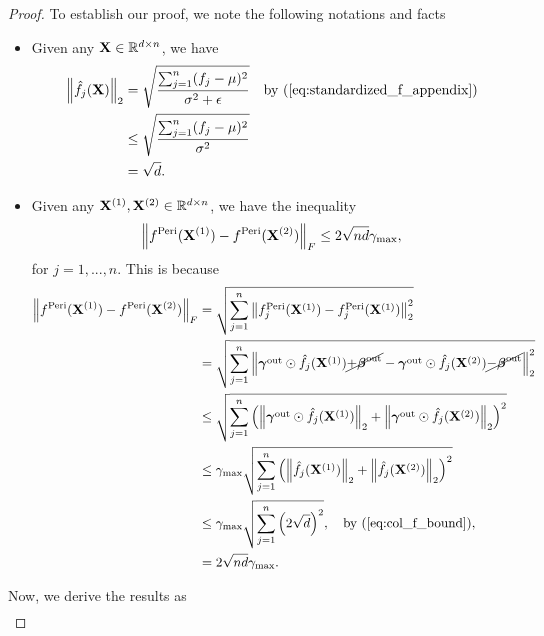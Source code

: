 \documentclass[journal]{IEEEtran}
\newcommand{\bfX}{{\bf X}}
\newcommand{\bfgamma}{{\boldsymbol \gamma}}
\newcommand{\bfbeta}{{\boldsymbol \beta}}
\theoremstyle{plain}
\theoremstyle{definition}
\theoremstyle{remark}
\begin{document}
\begin{proof}
    To establish our proof, we note the following notations and facts
    \begin{itemize}
\item Given any $\bfX \in \mathbb{R}^{d \times n}$, we have
\begin{align}
    \left\| \hat{f}_j(\bfX) \right\|_2 &=  \sqrt{\frac{\sum_{j=1}^n (f_j-\mu)^2}{\sigma^2 + \epsilon}} \quad \text{by (\ref{eq:standardized_f_appendix})} \nonumber \\
    &\leq \sqrt{\frac{\sum_{j=1}^n (f_j-\mu)^2}{\sigma^2 }} \nonumber \\
    &= \sqrt{d} \label{eq:col_f_bound}.
\end{align}
\item Given any $\bfX^{(1)}, \bfX^{(2)} \in \mathbb{R}^{d \times n}$, we have the inequality
        \begin{equation}\label{eq:diff_term_bound}
            \left\|  f^{\rm Peri}(\bfX^{(1)}) - f^{\rm Peri}(\bfX^{(2)}) \right\|_F \leq 2 \sqrt{nd} \gamma_{\rm max},
        \end{equation}
        for $j=1,...,n$. This is because
        \begin{align*}
            \left\|  f^{\rm Peri}(\bfX^{(1)}) - f^{\rm Peri}(\bfX^{(2)}) \right\|_F &= \sqrt{\sum_{j=1}^n \left\|  f_j^{\rm Peri}(\bfX^{(1)}) - f_j^{\rm Peri}(\bfX^{(1)}) \right\|_2^2} \\
            &= \sqrt{\sum_{j=1}^n \left\| \bfgamma^{\rm out} \odot \hat{f}_j(\bfX^{(1)}) \cancel{+ \bfbeta^{\rm out}} -\bfgamma^{\rm out} \odot \hat{f}_j(\bfX^{(2)}) \cancel{- \bfbeta^{\rm out}} \right\|_2^2} \\ 
            & \leq \sqrt{ \sum_{j=1}^n \left( \left\| \bfgamma^{\rm out} \odot \hat{f}_j(\bfX^{(1)}) \right\|_2  + \left\| \bfgamma^{\rm out} \odot \hat{f}_j(\bfX^{(2)}) \right\|_2 \right)^2} \\
            &\leq \gamma_{\rm max} \sqrt{ \sum_{j=1}^n \left( \left\| \hat{f}_j(\bfX^{(1)}) \right\|_2 + \left\| \hat{f}_j(\bfX^{(2)}) \right\|_2 \right)^2 }\\
            &\leq \gamma_{\rm max} \sqrt{ \sum_{j=1}^n \left( 2 \sqrt{d} \right)^2 }, \quad \text{by (\ref{eq:col_f_bound})},\\
            &= 2 \sqrt{nd} \gamma_{\rm max} . 
        \end{align*}
    \end{itemize}
    Now, we derive the results as 
    \begin{align}

\end{align}
\end{proof}
\end{document}

